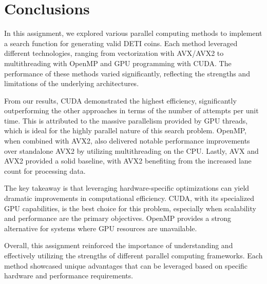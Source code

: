 \documentclass[a4paper,12pt]{article}
\begin{document}
\section{Conclusions}
\label{sec:discussion}

In this assignment, we explored various parallel computing methods to implement a search function for generating valid DETI coins. Each method leveraged different technologies, ranging from vectorization with AVX/AVX2 to multithreading with OpenMP and GPU programming with CUDA. The performance of these methods varied significantly, reflecting the strengths and limitations of the underlying architectures.

From our results, CUDA demonstrated the highest efficiency, significantly outperforming the other approaches in terms of the number of attempts per unit time. This is attributed to the massive parallelism provided by GPU threads, which is ideal for the highly parallel nature of this search problem. OpenMP, when combined with AVX2, also delivered notable performance improvements over standalone AVX2 by utilizing multithreading on the CPU. Lastly, AVX and AVX2 provided a solid baseline, with AVX2 benefiting from the increased lane count for processing data.

The key takeaway is that leveraging hardware-specific optimizations can yield dramatic improvements in computational efficiency. CUDA, with its specialized GPU capabilities, is the best choice for this problem, especially when scalability and performance are the primary objectives. OpenMP provides a strong alternative for systems where GPU resources are unavailable.

Overall, this assignment reinforced the importance of understanding and effectively utilizing the strengths of different parallel computing frameworks. Each method showcased unique advantages that can be leveraged based on specific hardware and performance requirements.
\end{document}
